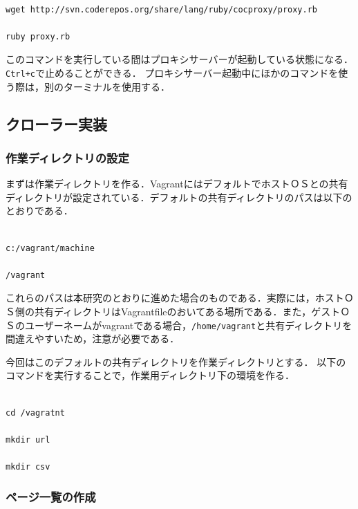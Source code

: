 \begin{verbatim}

wget http://svn.coderepos.org/share/lang/ruby/cocproxy/proxy.rb

ruby proxy.rb

\end{verbatim}

このコマンドを実行している間はプロキシサーバーが起動している状態になる．\texttt{Ctrl+c}で止めることができる．
プロキシサーバー起動中にほかのコマンドを使う際は，別のターミナルを使用する．

\subsection{クローラー実装}

\subsubsection{作業ディレクトリの設定}

まずは作業ディレクトリを作る．VagrantにはデフォルトでホストＯＳとの共有ディレクトリが設定されている．デフォルトの共有ディレクトリのパスは以下のとおりである．

\begin{verbatim}

c:/vagrant/machine

/vagrant

\end{verbatim}

これらのパスは本研究のとおりに進めた場合のものである．実際には，ホストＯＳ側の共有ディレクトリはVagrantfileのおいてある場所である．また，ゲストＯＳのユーザーネームがvagrantである場合，\texttt{/home/vagrant}と共有ディレクトリを間違えやすいため，注意が必要である．

今回はこのデフォルトの共有ディレクトリを作業ディレクトリとする．
以下のコマンドを実行することで，作業用ディレクトリ下の環境を作る．

\begin{verbatim}

cd /vagratnt

mkdir url

mkdir csv

\end{verbatim}

\subsubsection{ページ一覧の作成}

